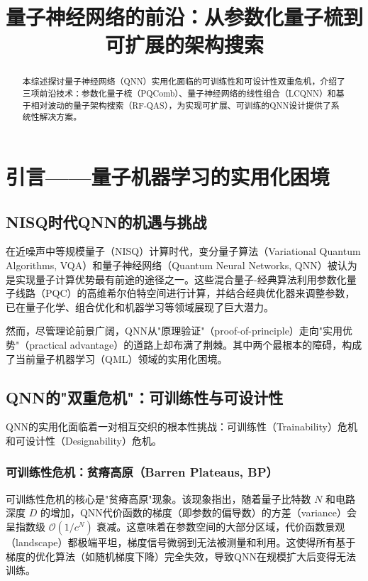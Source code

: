 \documentclass[12pt,a4paper]{article}
\title{量子神经网络的前沿：从参数化量子梳到可扩展的架构搜索}
\author{}
\date{}
\begin{document}
\maketitle

\begin{abstract}
本综述探讨量子神经网络（QNN）实用化面临的可训练性和可设计性双重危机，介绍了三项前沿技术：参数化量子梳（PQComb）、量子神经网络的线性组合（LCQNN）和基于相对波动的量子架构搜索（RF-QAS），为实现可扩展、可训练的QNN设计提供了系统性解决方案。
\end{abstract}

\section{引言——量子机器学习的实用化困境}

\subsection{NISQ时代QNN的机遇与挑战}

在近噪声中等规模量子（NISQ）计算时代，变分量子算法（Variational Quantum Algorithms, VQA）和量子神经网络（Quantum Neural Networks, QNN）被认为是实现量子计算优势最有前途的途径之一。这些混合量子-经典算法利用参数化量子线路（PQC）的高维希尔伯特空间进行计算，并结合经典优化器来调整参数，已在量子化学、组合优化和机器学习等领域展现了巨大潜力。

然而，尽管理论前景广阔，QNN从"原理验证"（proof-of-principle）走向"实用优势"（practical advantage）的道路上却布满了荆棘。其中两个最根本的障碍，构成了当前量子机器学习（QML）领域的实用化困境。

\subsection{QNN的"双重危机"：可训练性与可设计性}

QNN的实用化面临着一对相互交织的根本性挑战：可训练性（Trainability）危机和可设计性（Designability）危机。

\subsubsection{可训练性危机：贫瘠高原（Barren Plateaus, BP）}

可训练性危机的核心是"贫瘠高原"现象。该现象指出，随着量子比特数 $N$ 和电路深度 $D$ 的增加，QNN代价函数的梯度（即参数的偏导数）的方差（variance）会呈指数级 $\mathcal{O}(1/c^N)$ 衰减。这意味着在参数空间的大部分区域，代价函数景观（landscape）都极端平坦，梯度信号微弱到无法被测量和利用。这使得所有基于梯度的优化算法（如随机梯度下降）完全失效，导致QNN在规模扩大后变得无法训练。
\end{document}
